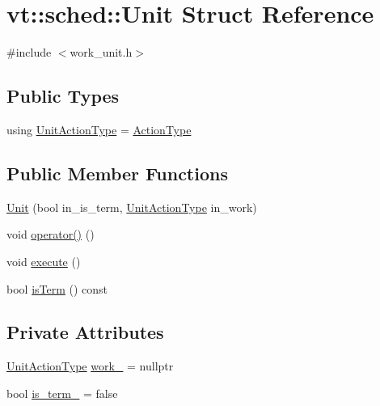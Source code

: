 \hypertarget{structvt_1_1sched_1_1_unit}{}\section{vt\+:\+:sched\+:\+:Unit Struct Reference}
\label{structvt_1_1sched_1_1_unit}


{\ttfamily \#include $<$work\+\_\+unit.\+h$>$}

\subsection*{Public Types}
\begin{DoxyCompactItemize}
\item 
using \hyperlink{structvt_1_1sched_1_1_unit_a94de9219796a6b3134e5f6f87cc017d8}{Unit\+Action\+Type} = \hyperlink{namespacevt_ae0a5a7b18cc99d7b732cb4d44f46b0f3}{Action\+Type}
\end{DoxyCompactItemize}
\subsection*{Public Member Functions}
\begin{DoxyCompactItemize}
\item 
\hyperlink{structvt_1_1sched_1_1_unit_a7445ffcd3650520b912134ab8f2213b8}{Unit} (bool in\+\_\+is\+\_\+term, \hyperlink{structvt_1_1sched_1_1_unit_a94de9219796a6b3134e5f6f87cc017d8}{Unit\+Action\+Type} in\+\_\+work)
\item 
void \hyperlink{structvt_1_1sched_1_1_unit_a27a4a3910deb80e18bfedc9720efa9f6}{operator()} ()
\item 
void \hyperlink{structvt_1_1sched_1_1_unit_abb9552d5ca05e00ea19b8d3097ad01d9}{execute} ()
\item 
bool \hyperlink{structvt_1_1sched_1_1_unit_a2efa80f96380e04ed664ba2fcd123a61}{is\+Term} () const
\end{DoxyCompactItemize}
\subsection*{Private Attributes}
\begin{DoxyCompactItemize}
\item 
\hyperlink{structvt_1_1sched_1_1_unit_a94de9219796a6b3134e5f6f87cc017d8}{Unit\+Action\+Type} \hyperlink{structvt_1_1sched_1_1_unit_ad1c63e6b9e5f734c1d3a63ca121c4c43}{work\+\_\+} = nullptr
\item 
bool \hyperlink{structvt_1_1sched_1_1_unit_a1e404191431e8fe102bbe000aa76a8e2}{is\+\_\+term\+\_\+} = false
\end{DoxyCompactItemize}


